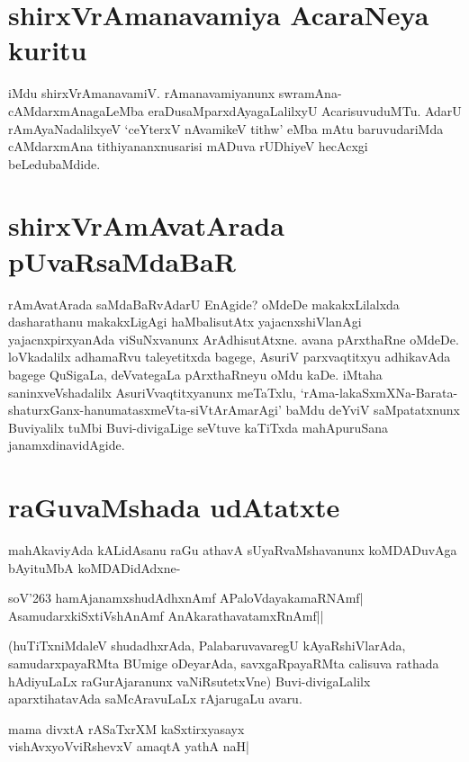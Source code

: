 \section*{shirxVrAmanavamiya AcaraNeya kuritu} 

iMdu shirxVrAmanavamiV. rAmanavamiyanunx swramAna-cAMdarxmAnagaLeMba eraDusaMparxdAyagaLalilxyU AcarisuvuduMTu. AdarU rAmAyaNadalilxyeV `ceYterxV nAvamikeV tithw' eMba mAtu baruvudariMda cAMdarxmAna tithiyananxnusarisi mADuva rUDhiyeV hecAcxgi beLedubaMdide. 

\section*{shirxVrAmAvatArada pUvaRsaMdaBaR}

rAmAvatArada saMdaBaRvAdarU EnAgide? oMdeDe makakxLilalxda dasharathanu makakxLigAgi haMbalisutAtx yajacnxshiVlanAgi yajacnxpirxyanAda viSuNxvanunx ArAdhisutAtxne. avana pArxthaRne oMdeDe. loVkadalilx adhamaRvu taleyetitxda bagege, AsuriV parxvaqtitxyu adhikavAda bagege QuSigaLa, deVvategaLa pArxthaRneyu oMdu kaDe. iMtaha saninxveVshadalilx AsuriVvaqtitxyanunx meTaTxlu, `rAma-lakaSxmXNa-Barata-shaturxGanx-hanumatasxmeVta-siVtArAmarAgi' baMdu deYviV saMpatatxnunx Buviyalilx tuMbi Buvi-divigaLige seVtuve kaTiTxda mahApuruSana janamxdinavidAgide. 

\section*{raGuvaMshada udAtatxte} 

mahAkaviyAda kALidAsanu raGu athavA sUyaRvaMshavanunx koMDADuvAga bAyituMbA koMDADidAdxne- 

\begin{shloka} 
soV\char'263 hamAjanamxshudAdhxnAmf APaloVdayakamaRNAmf|\label{148b}\\ 
AsamudarxkiSxtiVshAnAmf AnAkarathavatamxRnAmf||
\end{shloka} 

(huTiTxniMdaleV shudadhxrAda, PalabaruvavaregU kAyaRshiVlarAda, samudarxpayaRMta BUmige oDeyarAda, savxgaRpayaRMta calisuva rathada hAdiyuLaLx raGurAjaranunx vaNiRsutetxVne) Buvi-divigaLalilx aparxtihatavAda saMcAravuLaLx rAjarugaLu avaru. 

\begin{shloka} 
mama divxtA rASaTxrXM kaSxtirxyasayx\label{148a}\\ 
vishAvxyoVviRshevxV amaqtA yathA naH|
\end{shloka} 

